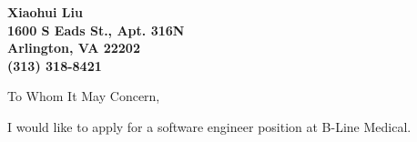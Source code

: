 \documentclass[11pt]{letter} %
\newcommand{\company}{B-Line Medical}
\begin{document}

\begin{letter}
	{}


\begin{center}
\large\bf Xiaohui Liu \\ %
1600 S Eads St., Apt. 316N \\ Arlington, VA 22202 \\ (313) 318-8421 %
\end{center} 
\vfill

\signature{Xiaohui Liu} %


\opening{To Whom It May Concern,}

I would like to apply for a software engineer position at \company{}.


\end{letter}
\end{document}
